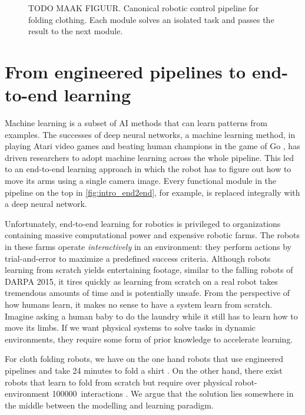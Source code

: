 \documentclass[\home/main.tex]{subfiles}
\begin{document}
\begin{figure}
    \centering
    
    \caption{TODO MAAK FIGUUR. Canonical robotic control pipeline for folding clothing. Each module solves an isolated task and passes the result to the next module.}
    \label{fig:intro_canonical_control_pipeline}
\end{figure}

\section{From engineered pipelines to end-to-end learning}
Machine learning is a subset of \gls{AI} methods that can learn patterns from examples. The successes of deep neural networks, a machine learning method, in playing Atari video games \autocite{Mnih2015} and beating human champions in the game of Go \autocite{gaemofGo2016}, has driven researchers to adopt machine learning across the whole pipeline. This led to an end-to-end learning approach in which the robot has to figure out how to move its arms using a single camera image. Every functional module in the pipeline on the top in \cref{fig:intro_end2end}, for example, is replaced integrally with a deep neural network.

Unfortunately, end-to-end learning for robotics is privileged to organizations containing massive computational power and expensive robotic farms. The robots in these farms operate \emph{interactively} in an environment: they perform actions by trial-and-error to maximize a predefined success criteria. Although robots learning from scratch yields entertaining footage, similar to the falling robots of DARPA 2015, it tires quickly as learning from scratch on a real robot takes tremendous amounts of time and is potentially unsafe. From the perspective of how humans learn, it makes no sense to have a system learn from scratch. Imagine asking a human baby to do the laundry while it still has to learn how to move its limbs. If we want physical systems to solve tasks in dynamic environments, they require some form of prior knowledge to accelerate learning. 

For cloth folding robots, we have on the one hand robots that use engineered pipelines and take 24 minutes to fold a shirt \autocite{Maitin2010}. On the other hand, there exist robots that learn to fold from scratch but require over physical robot-environment \qty{100000}{interactions} \autocite{Matas2018}. We argue that the solution lies somewhere in the middle between the modelling and learning paradigm.
\end{document}
